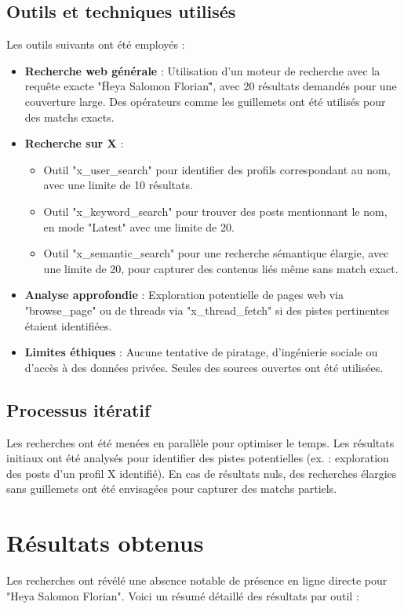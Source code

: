 \documentclass[12pt,a4paper]{article}
\begin{document}
\subsection{Outils et techniques utilisés}
Les outils suivants ont été employés :
\begin{itemize}
    \item \textbf{Recherche web générale} : Utilisation d'un moteur de recherche avec la requête exacte "\"Heya Salomon Florian\"", avec 20 résultats demandés pour une couverture large. Des opérateurs comme les guillemets ont été utilisés pour des matchs exacts.
    \item \textbf{Recherche sur X} :
        \begin{itemize}
            \item Outil "x\_user\_search" pour identifier des profils correspondant au nom, avec une limite de 10 résultats.
            \item Outil "x\_keyword\_search" pour trouver des posts mentionnant le nom, en mode "Latest" avec une limite de 20.
            \item Outil "x\_semantic\_search" pour une recherche sémantique élargie, avec une limite de 20, pour capturer des contenus liés même sans match exact.
        \end{itemize}
    \item \textbf{Analyse approfondie} : Exploration potentielle de pages web via "browse\_page" ou de threads via "x\_thread\_fetch" si des pistes pertinentes étaient identifiées.
    \item \textbf{Limites éthiques} : Aucune tentative de piratage, d'ingénierie sociale ou d'accès à des données privées. Seules des sources ouvertes ont été utilisées.
\end{itemize}

\subsection{Processus itératif}
Les recherches ont été menées en parallèle pour optimiser le temps. Les résultats initiaux ont été analysés pour identifier des pistes potentielles (ex. : exploration des posts d'un profil X identifié). En cas de résultats nuls, des recherches élargies sans guillemets ont été envisagées pour capturer des matchs partiels.

\section{Résultats obtenus}
Les recherches ont révélé une absence notable de présence en ligne directe pour "Heya Salomon Florian". Voici un résumé détaillé des résultats par outil :
\end{document}
